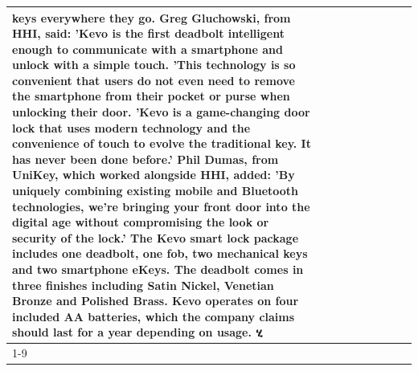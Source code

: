 \begin{table}[H]
\begin{tabular}{lllrlllll}
keys everywhere they go. Greg Gluchowski, from HHI, said: 'Kevo is the first deadbolt intelligent enough to communicate with a smartphone and unlock with a simple touch. 'This technology is so convenient that users do not even need to remove the smartphone from their pocket or purse when unlocking their door. 'Kevo is a game-changing door lock that uses modern technology and the convenience of touch to evolve the traditional key. It has never been done before.' Phil Dumas, from UniKey, which worked alongside HHI, added: 'By uniquely combining existing mobile and Bluetooth technologies, we’re bringing your front door into the digital age without compromising the look or security of the lock.' The Kevo smart lock package includes one deadbolt, one fob, two mechanical keys and two smartphone eKeys. The deadbolt comes in three finishes including Satin Nickel, Venetian Bronze and Polished Brass. Kevo operates on four included AA batteries, which the company claims should last for a year depending on usage. ሂ \\
\cline{1-9}

\end{tabular}
\end{table}
